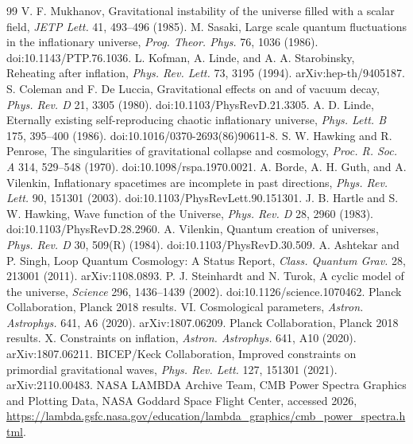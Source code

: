 \documentclass[10pt,a4paper]{report}
\begin{document}
\begin{thebibliography}{99}
 V. F. Mukhanov, Gravitational instability of the universe filled with a scalar field, \emph{JETP Lett.} 41, 493--496 (1985).
 M. Sasaki, Large scale quantum fluctuations in the inflationary universe, \emph{Prog. Theor. Phys.} 76, 1036 (1986). doi:10.1143/PTP.76.1036.
 L. Kofman, A. Linde, and A. A. Starobinsky, Reheating after inflation, \emph{Phys. Rev. Lett.} 73, 3195 (1994). arXiv:hep-th/9405187.
 S. Coleman and F. De Luccia, Gravitational effects on and of vacuum decay, \emph{Phys. Rev. D} 21, 3305 (1980). doi:10.1103/PhysRevD.21.3305.
 A. D. Linde, Eternally existing self-reproducing chaotic inflationary universe, \emph{Phys. Lett. B} 175, 395--400 (1986). doi:10.1016/0370-2693(86)90611-8.
 S. W. Hawking and R. Penrose, The singularities of gravitational collapse and cosmology, \emph{Proc. R. Soc. A} 314, 529--548 (1970). doi:10.1098/rspa.1970.0021.
 A. Borde, A. H. Guth, and A. Vilenkin, Inflationary spacetimes are incomplete in past directions, \emph{Phys. Rev. Lett.} 90, 151301 (2003). doi:10.1103/PhysRevLett.90.151301.
 J. B. Hartle and S. W. Hawking, Wave function of the Universe, \emph{Phys. Rev. D} 28, 2960 (1983). doi:10.1103/PhysRevD.28.2960.
 A. Vilenkin, Quantum creation of universes, \emph{Phys. Rev. D} 30, 509(R) (1984). doi:10.1103/PhysRevD.30.509.
 A. Ashtekar and P. Singh, Loop Quantum Cosmology: A Status Report, \emph{Class. Quantum Grav.} 28, 213001 (2011). arXiv:1108.0893.
 P. J. Steinhardt and N. Turok, A cyclic model of the universe, \emph{Science} 296, 1436--1439 (2002). doi:10.1126/science.1070462.
 Planck Collaboration, Planck 2018 results. VI. Cosmological parameters, \emph{Astron. Astrophys.} 641, A6 (2020). arXiv:1807.06209.
 Planck Collaboration, Planck 2018 results. X. Constraints on inflation, \emph{Astron. Astrophys.} 641, A10 (2020). arXiv:1807.06211.
 BICEP/Keck Collaboration, Improved constraints on primordial gravitational waves, \emph{Phys. Rev. Lett.} 127, 151301 (2021). arXiv:2110.00483.
 NASA LAMBDA Archive Team, CMB Power Spectra Graphics and Plotting Data, NASA Goddard Space Flight Center, accessed 2026, \url{https://lambda.gsfc.nasa.gov/education/lambda_graphics/cmb_power_spectra.html}.
\end{thebibliography}
\end{document}
